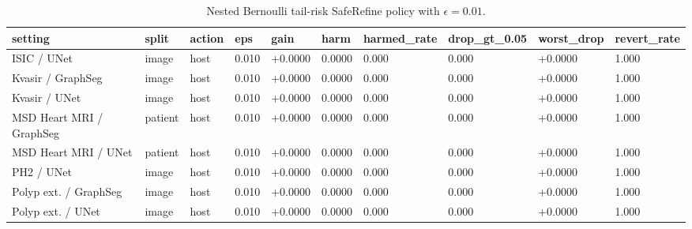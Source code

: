 \begin{table}[t]
\centering
\small
\caption{Nested Bernoulli tail-risk SafeRefine policy with $\epsilon=0.01$.}
\label{tab:tail_risk_nested_eps001_bernoulli_best}
\begin{tabular}{llllllllll}
\toprule
setting & split & action & eps & gain & harm & harmed\_rate & drop\_gt\_0.05 & worst\_drop & revert\_rate \\
\midrule
ISIC / UNet & image & host & 0.010 & +0.0000 & 0.0000 & 0.000 & 0.000 & +0.0000 & 1.000 \\
Kvasir / GraphSeg & image & host & 0.010 & +0.0000 & 0.0000 & 0.000 & 0.000 & +0.0000 & 1.000 \\
Kvasir / UNet & image & host & 0.010 & +0.0000 & 0.0000 & 0.000 & 0.000 & +0.0000 & 1.000 \\
MSD Heart MRI / GraphSeg & patient & host & 0.010 & +0.0000 & 0.0000 & 0.000 & 0.000 & +0.0000 & 1.000 \\
MSD Heart MRI / UNet & patient & host & 0.010 & +0.0000 & 0.0000 & 0.000 & 0.000 & +0.0000 & 1.000 \\
PH2 / UNet & image & host & 0.010 & +0.0000 & 0.0000 & 0.000 & 0.000 & +0.0000 & 1.000 \\
Polyp ext. / GraphSeg & image & host & 0.010 & +0.0000 & 0.0000 & 0.000 & 0.000 & +0.0000 & 1.000 \\
Polyp ext. / UNet & image & host & 0.010 & +0.0000 & 0.0000 & 0.000 & 0.000 & +0.0000 & 1.000 \\
\bottomrule
\end{tabular}
\end{table}
